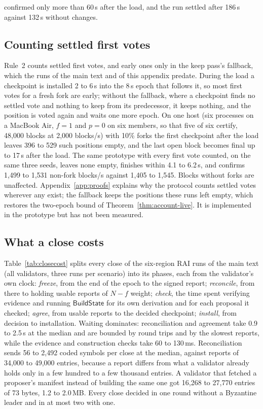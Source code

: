 \documentclass[conference]{IEEEtran}
\newcommand{\Build}{\mathsf{BuildState}}
\begin{document}
confirmed only more than 60\,s after the load, and the run settled after 186\,s against 132\,s without changes.

\subsection{Counting settled first votes}
\label{app:settled}
Rule~2 counts settled first votes, and early ones only in the keep pass's fallback, which the runs of the main text and of this appendix predate. During the load a checkpoint is installed 2 to 6\,s into the 8\,s epoch that follows it, so most first votes for a fresh fork are early; without the fallback, where a checkpoint finds no settled vote and nothing to keep from its predecessor, it keeps nothing, and the position is voted again and waits one more epoch. On one host (six processes on a MacBook Air, $f=1$ and $p=0$ on six members, so that five of six certify, 48{,}000 blocks at 2{,}000 blocks/s) with 10\% forks the first checkpoint after the load leaves 396 to 529 such positions empty, and the last open block becomes final up to 17\,s after the load. The same prototype with every first vote counted, on the same three seeds, leaves none empty, finishes within 4.1 to 6.2\,s, and confirms 1{,}499 to 1{,}531 non-fork blocks/s against 1{,}405 to 1{,}545. Blocks without forks are unaffected. Appendix~\ref{app:proofs} explains why the protocol counts settled votes wherever any exist; the fallback keeps the positions these runs left empty, which restores the two-epoch bound of Theorem~\ref{thm:account-live}. It is implemented in the prototype but has not been measured.

\subsection{What a close costs}
\label{app:closecost}
Table~\ref{tab:closecost} splits every close of the six-region RAI runs of the main text (all validators, three runs per scenario) into its phases, each from the validator's own clock: \emph{freeze}, from the end of the epoch to the signed report; \emph{reconcile}, from there to holding usable reports of $N-f$ weight; \emph{check}, the time spent verifying evidence and running $\Build$ for its own derivation and for each proposal it checked; \emph{agree}, from usable reports to the decided checkpoint; \emph{install}, from decision to installation. Waiting dominates: reconciliation and agreement take 0.9 to 2.5\,s at the median and are bounded by round trips and by the slowest reports, while the evidence and construction checks take 60 to 130\,ms. Reconciliation sends 56 to 2{,}492 coded symbols per close at the median, against reports of 34{,}000 to 49{,}000 entries, because a report differs from what a validator already holds only in a few hundred to a few thousand entries. A validator that fetched a proposer's manifest instead of building the same one got 16{,}268 to 27{,}770 entries of 73 bytes, 1.2 to 2.0\,MB. Every close decided in one round without a Byzantine leader and in at most two with one.
\end{document}
